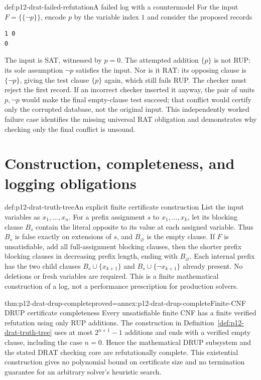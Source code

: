 \begin{hbexample}{def:p12-drat-failed-refutation}{A failed log with a countermodel}
For the input \(F=\{\{\neg p\}\}\), encode \(p\) by the variable
index \(1\) and consider the proposed records
\begin{verbatim}
1 0
0
\end{verbatim}
The input is SAT, witnessed by \(p=0\).  The attempted addition \(\{p\}\)
is not RUP: its sole assumption \(\neg p\) satisfies the input.  Nor is it
RAT: its opposing clause is \(\{\neg p\}\), giving the test clause
\(\{p\}\) again, which still fails RUP.  The checker must reject the
first record.  If an incorrect checker inserted it anyway, the pair of units
\(p,\neg p\) would make the final empty-clause test succeed; that conflict
would certify only the corrupted database, not the original input.
This independently worked failure case identifies the missing universal RAT
obligation and demonstrates why checking only the final conflict is unsound.
\end{hbexample}

\section{Construction, completeness, and logging obligations}

\begin{hbdefinition}{def:p12-drat-truth-tree}{An explicit finite certificate construction}
List the input variables as \(x_1,\ldots,x_n\).  For a prefix assignment
\(s\) to \(x_1,\ldots,x_k\), let its blocking clause \(B_s\) contain
the literal opposite to its value at each assigned variable.  Thus \(B_s\)
is false exactly on extensions of \(s\), and \(B_{\varnothing}\) is the
empty clause.  If \(F\) is unsatisfiable, add all full-assignment blocking
clauses, then the shorter prefix blocking clauses in decreasing prefix length,
ending with \(B_{\varnothing}\).  Each internal prefix has the two child
clauses \(B_s\cup\{x_{k+1}\}\) and
\(B_s\cup\{\neg x_{k+1}\}\) already present.  No deletions or fresh
variables are required.  This is a finite mathematical construction of a log,
not a performance prescription for production solvers.
\end{hbdefinition}

\begin{hbtheorem}{thm:p12-drat-drup-complete}{proved=annex:p12-drat-drup-complete}{Finite-CNF DRUP certificate completeness}
Every unsatisfiable finite CNF has a finite verified refutation using only RUP
additions.  The construction in Definition~\ref{def:p12-drat-truth-tree}
uses at most \(2^{n+1}-1\) additions and ends with a verified empty clause,
including the case \(n=0\).  Hence the mathematical DRUP subsystem and the
stated DRAT checking core are refutationally complete.  This existential
construction gives no polynomial bound on certificate size and no termination
guarantee for an arbitrary solver's heuristic search.
\end{hbtheorem}

